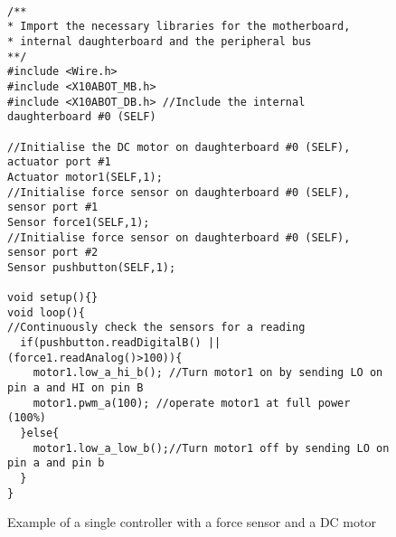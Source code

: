 \begin{figure}
		\footnotesize
		\begin{verbatim}

/**
* Import the necessary libraries for the motherboard, 
* internal daughterboard and the peripheral bus
**/
#include <Wire.h>  
#include <X10ABOT_MB.h>
#include <X10ABOT_DB.h> //Include the internal daughterboard #0 (SELF)

//Initialise the DC motor on daughterboard #0 (SELF), actuator port #1
Actuator motor1(SELF,1);
//Initialise force sensor on daughterboard #0 (SELF), sensor port #1
Sensor force1(SELF,1);
//Initialise force sensor on daughterboard #0 (SELF), sensor port #2
Sensor pushbutton(SELF,1);

void setup(){}
void loop(){
//Continuously check the sensors for a reading
  if(pushbutton.readDigitalB() || (force1.readAnalog()>100)){
    motor1.low_a_hi_b(); //Turn motor1 on by sending LO on pin a and HI on pin B
    motor1.pwm_a(100); //operate motor1 at full power (100%) 
  }else{
    motor1.low_a_low_b();//Turn motor1 off by sending LO on pin a and pin b
  }
}	 
	\end{verbatim}
  \caption{Example of a single controller with a force sensor and a DC motor} \label{code:simpl}
		
\end{figure}


